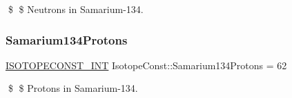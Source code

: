 \$ \$ Neutrons in Samarium-\/134. \mbox{\label{group___isotope_const-_samarium-_sm134_ga88a7d7bd37e3abf162272061ea1eccf2}} 
\subsubsection{\texorpdfstring{Samarium134\+Protons}{Samarium134Protons}}
{\footnotesize\ttfamily \mbox{\hyperlink{group___isotope_const-_macros_ga5f18360b3e99483a35c32d789e62621c}{I\+S\+O\+T\+O\+P\+E\+C\+O\+N\+S\+T\+\_\+\+I\+NT}} Isotope\+Const\+::\+Samarium134\+Protons = 62}

\$ \$ Protons in Samarium-\/134. 
